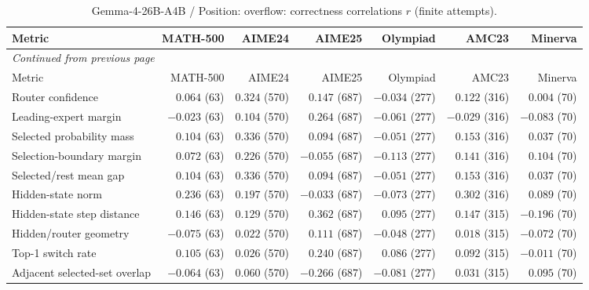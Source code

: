 \begingroup\scriptsize\setlength{\tabcolsep}{4pt}
\begin{longtable}{@{}lrrrrrr@{}}
\caption{Gemma-4-26B-A4B / Position: overflow: correctness correlations $r$ (finite attempts).}\label{tab:multi-gemma-position-overflow}\\
\toprule
Metric & MATH-500 & AIME24 & AIME25 & Olympiad & AMC23 & Minerva \\
\midrule\endfirsthead
\multicolumn{7}{l}{\textit{Continued from previous page}}\\
\toprule
Metric & MATH-500 & AIME24 & AIME25 & Olympiad & AMC23 & Minerva \\
\midrule\endhead
\bottomrule\endfoot
Router confidence & $0.064$ (63) & $0.324$ (570) & $0.147$ (687) & $-0.034$ (277) & $0.122$ (316) & $0.004$ (70) \\
Leading-expert margin & $-0.023$ (63) & $0.104$ (570) & $0.264$ (687) & $-0.061$ (277) & $-0.029$ (316) & $-0.083$ (70) \\
Selected probability mass & $0.104$ (63) & $0.336$ (570) & $0.094$ (687) & $-0.051$ (277) & $0.153$ (316) & $0.037$ (70) \\
Selection-boundary margin & $0.072$ (63) & $0.226$ (570) & $-0.055$ (687) & $-0.113$ (277) & $0.141$ (316) & $0.104$ (70) \\
Selected/rest mean gap & $0.104$ (63) & $0.336$ (570) & $0.094$ (687) & $-0.051$ (277) & $0.153$ (316) & $0.037$ (70) \\
Hidden-state norm & $0.236$ (63) & $0.197$ (570) & $-0.033$ (687) & $-0.073$ (277) & $0.302$ (316) & $0.089$ (70) \\
Hidden-state step distance & $0.146$ (63) & $0.129$ (570) & $0.362$ (687) & $0.095$ (277) & $0.147$ (315) & $-0.196$ (70) \\
Hidden/router geometry & $-0.075$ (63) & $0.022$ (570) & $0.111$ (687) & $-0.048$ (277) & $0.018$ (315) & $-0.072$ (70) \\
Top-1 switch rate & $0.105$ (63) & $0.026$ (570) & $0.240$ (687) & $0.086$ (277) & $0.092$ (315) & $-0.011$ (70) \\
Adjacent selected-set overlap & $-0.064$ (63) & $0.060$ (570) & $-0.266$ (687) & $-0.081$ (277) & $0.031$ (315) & $0.095$ (70) \\
\end{longtable}\endgroup


